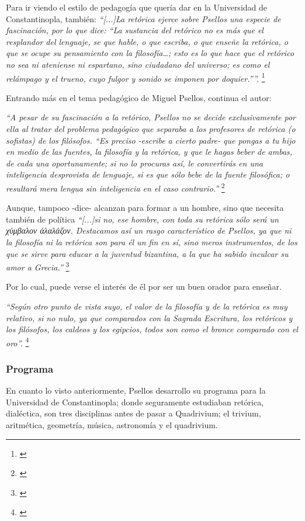 Para ir viendo el estilo de pedagogía que quería dar en la 
Universidad de Constantinopla, también: \textit{“[...]La retórica ejerce 
sobre Psellos una especie de fascinación, por lo que dice: 
“La sustancia del retórico no es más que el resplandor del lenguaje, 
se que hable, o que escriba, o que enseñe la retórica, 
o que se ocupe su pensamiento con la filosofía…; esto es lo que 
hace que el retórico no sea ni ateniense ni espartano, sino ciudadano 
del universo; es como el relámpago y el trueno, cuyo fulgor y sonido 
se imponen por doquier.””.}
\footnote{\cite[p.~161]{filosofia}}

Entrando más en el tema pedagógico de Miguel Psellos, continua el autor:

\textit{“A pesar de su fascinación a la retórico, Psellos no se decide 
exclusivamente por ella al tratar del problema pedagógico que separaba 
a los profesores de retórica (o sofistas) de los filósofos. 
“Es preciso -escribe a cierto padre- que pongas a tu hijo en medio de 
las fuentes, la filosofía y la retórica, y que le hagas beber de ambas, 
de cada una oportunamente; si no lo procuras así, le convertirás en 
una inteligencia desprovista de lenguaje, si es que sólo bebe de la 
fuente filosófica; o resultará mera lengua sin inteligencia en el 
caso contrario.”}
\footnote{\cite[p.~161]{filosofia}}

Aunque, tampoco -dice- alcanzan para formar a un hombre, sino que 
necesita también de política \textit{“[...]si no, ese hombre, con toda su 
retórica sólo será un 
	χύμβαλον άλαλάζον.
 Destacamos así un rasgo característico de Psellos, ya que ni la 
 filosofía ni la retórica son para él un fin en sí, sino meros 
 instrumentos, de los que se sirve para educar a la juventud bizantina, 
 a la que ha sabido inculcar su amor a Grecia.”}
 \footnote{\cite[p.~161]{filosofia}}

Por lo cual, puede verse el interés de él por ser un buen 
orador para enseñar.

\textit{“Según otro punto de vista suyo, el valor de la filosofía y de la 
retórica es muy relativo, si no nulo, ya que comparados con la 
Sagrada Escritura, los retóricos y los filósofos, 
los caldeos y los egipcios, todos son como el 
bronce comparado con el oro”.}
\footnote{\cite[p.~161]{filosofia}}

\subsubsection{Programa}
En cuanto lo visto anteriormente, Psellos desarrollo su 
programa para la Universidad de Constantinopla; donde seguramente
estudiaban retórica, dialéctica, son tres disciplinas antes
de pasar a Quadrivium;
el trivium, aritmética, geometría, 
música, astronomía y el quadrivium.

